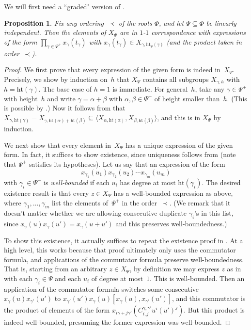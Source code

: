 \documentclass[10pt,a4paper]{article}
\newtheorem{proposition}[theorem]{Proposition}
\theoremstyle{definition}
\newcommand{\hgt}{{\mathrm{ht}}}
\begin{document}
We will first need a ``graded" version of .
\begin{proposition}\label{substruct}
    Fix any ordering~$\prec$ of the roots $\Phi$, and let $\Psi \subseteq \Phi$ be linearly independent.  Then the elements of $X_{\Psi}$ are in $1$-$1$ correspondence with expressions of the form $\prod_{\gamma \in \Psi^+} x_{\gamma}(t_\gamma)$ with  $x_\gamma(t_\gamma) \in X_{\gamma,\hgt_\Psi(\gamma)}$ (and the product taken in order~$\prec$).
\end{proposition}
\begin{proof}
    We first prove that every expression of the given form is indeed in~$X_\Psi$.  Precisely, we show by induction on~$h$ that $X_\Psi$ contains all subgroups $X_{\gamma,h}$ with $h = \hgt(\gamma)$.
    The base case of $h = 1$ is immediate.
    For general~$h$, take any $\gamma \in \Psi^+$ with height~$h$ and write $\gamma = \alpha + \beta$ with $\alpha,\beta \in \Psi^+$ of height smaller than~$h$.  (This is possible by .)  Now it follows from  that $X_{\gamma,\hgt(\gamma)} = X_{\gamma,\hgt(\alpha)+\hgt(\beta)} \subseteq \langle X_{\alpha, \hgt(\alpha)}, X_{\beta, \hgt(\beta)} \rangle$, and this is in $X_\Psi$ by induction.  

    We next show that every element in~$X_\Psi$ has a unique expression of the given form.
    In fact, it suffices to show existence, since uniqueness follows from  (note that $\Psi^+$ satisfies its hypotheses). 
    Let us say that an expression of the form
    \begin{equation}    \label{eqn:wellb}
        x_{\gamma_1}(u_1) x_{\gamma_2}(u_2)\cdots x_{\gamma_m}(u_m)
    \end{equation}
    with $\gamma_i \in \Psi^+$ is \emph{well-bounded} if each $u_i$ has degree at most $\hgt(\gamma_i)$.
    The desired existence result is that every $z \in X_{\Psi}$ has a well-bounded expression as above, where $\gamma_1, \dots, \gamma_m$ list the elements of~$\Psi^+$ in the order~$\prec$.  (We remark that it doesn't matter whether we are allowing consecutive duplicate $\gamma_i$'s in this list, since $x_{\gamma}(u) x_{\gamma}(u') = x_{\gamma}(u+u')$ and this preserves well-boundedness.)

    To show this existence, it actually suffices to repeat the existence proof in .  At a high level, this works because that proof ultimately only uses the commutator formula, and applications of the commutator formula preserve well-boundedness.  That is, starting from an arbitrary $z \in X_\Psi$, by definition we may express $z$ as in  with each $\gamma_i \in \Psi$ and each $u_i$ of degree at most~$1$.  This is well-bounded.  Then  an application of the commutator formula switches some  consecutive $x_{\gamma}(u)x_{\gamma'}(u')$ to $x_{\gamma'}(u')x_{\gamma}(u)[x_{\gamma}(u),x_{\gamma'}(u')]$, and this commutator is the product of elements of the form $x_{i\gamma + j \gamma'}(C_{i,j}^{\gamma,\gamma'} u^i (u')^j)$.  But this product is indeed well-bounded, presuming the former expression was well-bounded.


\end{proof}
\end{document}
